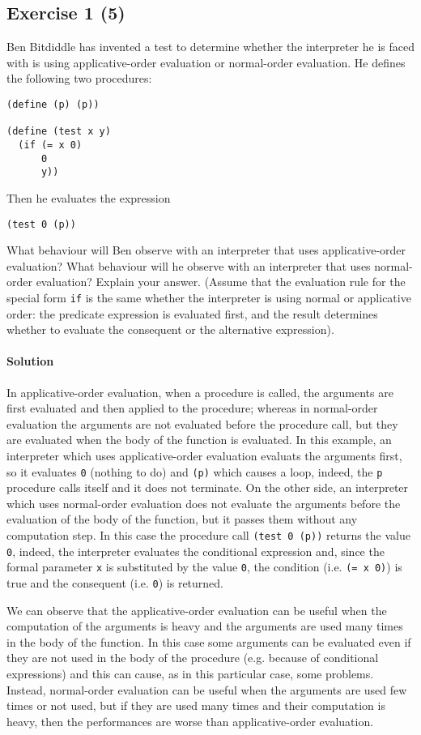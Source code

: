 \subsection*{Exercise 1 (5)}
Ben Bitdiddle has invented a test to determine whether the interpreter he is faced with is using applicative-order evaluation 
or normal-order evaluation. He defines the following two procedures:

\begin{lstlisting}
(define (p) (p))

(define (test x y)
  (if (= x 0)
      0
      y))
\end{lstlisting}

Then he evaluates the expression

\begin{lstlisting}
(test 0 (p))
\end{lstlisting}

What behaviour will Ben observe with an interpreter that uses applicative-order evaluation? What behaviour will he
observe with an interpreter that uses normal-order evaluation? Explain your answer. (Assume that the evaluation
rule for the special form \texttt{if} is the same whether the interpreter is using normal or applicative order: the predicate 
expression is evaluated first, and the result determines whether to evaluate the consequent or the alternative expression).

\paragraph{Solution}
In applicative-order evaluation, when a procedure is called, the arguments are first evaluated and then applied to the
procedure; whereas in normal-order evaluation the arguments are not evaluated before the procedure call, but they are evaluated
when the body of the function is evaluated.
In this example, an interpreter which uses applicative-order evaluation evaluats the arguments first, so it evaluates \texttt{0} 
(nothing to do) and \texttt{(p)} which causes a loop, indeed, the \texttt{p} procedure calls itself and it does not terminate.
On the other side, an interpreter which uses normal-order evaluation does not evaluate the arguments before the evaluation of
the body of the function, but it passes them without any computation step. In this case the procedure call \texttt{(test 0 (p))}
returns the value \texttt{0}, indeed, the interpreter evaluates the conditional expression and, since the formal parameter \texttt{x}
is substituted by the value \texttt{0}, the condition (i.e. \texttt{(= x 0)}) is true and the consequent (i.e. \texttt{0}) is returned.

We can observe that the applicative-order evaluation can be useful when the computation of the arguments is heavy and the arguments are
used many times in the body of the function. In this case some arguments can be evaluated even if they are not used in the body of the
procedure (e.g. because of conditional expressions) and this can cause, as in this particular case, some problems.
Instead, normal-order evaluation can be useful when the arguments are used few times or not used, but if they are used many times 
and their computation is heavy, then the performances are worse than applicative-order evaluation.